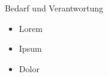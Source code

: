 \documentclass[xcolor=table,9pt,aspectratio=169]{beamer}
\begin{document}
\begin{frame}{\vspace*{10mm}Bedarf und Verantwortung}
\begin{multicols}{2}
\begin{itemize}
   \item Lorem
   \item Ipsum
   \item Dolor
\end{itemize}
\vfill

\begin{center}
   \vspace{1cm}
   \vspace{1cm}
\end{center}
\end{multicols}
\end{frame}
\end{document}
